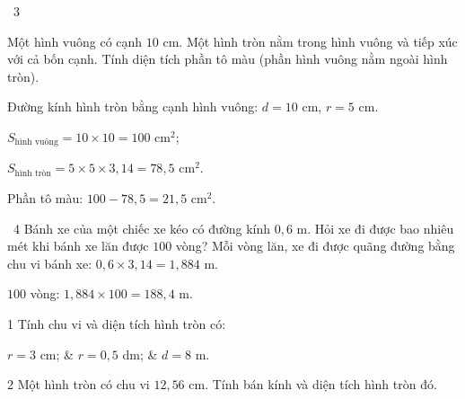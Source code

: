 \begin{exbox}{\ExWord\ 3}
\begin{minipage}[t]{0.66\linewidth}
Một hình vuông có cạnh $10$ cm. Một hình tròn nằm trong hình vuông và tiếp xúc với cả bốn cạnh. Tính diện tích phần tô màu (phần hình vuông nằm ngoài hình tròn).
\end{minipage}\hfill
\begin{minipage}[t]{0.3\linewidth}\vspace{0pt}\centering
{}
\end{minipage}
\guide
Đường kính hình tròn bằng cạnh hình vuông: $d=10$ cm, $r=5$ cm.\par
$S_\text{hình vuông}=10\times10=100$ cm$^2$;\par $S_\text{hình tròn}=5\times5\times3{,}14=78{,}5$ cm$^2$.\par
Phần tô màu: $100-78{,}5=21{,}5$ cm$^2$.
\end{exbox}
\gap
\begin{exbox}{\ExWord\ 4}
Bánh xe của một chiếc xe kéo có đường kính $0{,}6$ m. Hỏi xe đi được bao nhiêu mét khi bánh xe lăn được $100$ vòng?
\guide
Mỗi vòng lăn, xe đi được quãng đường bằng chu vi bánh xe: $0{,}6\times3{,}14=1{,}884$ m.\par
$100$ vòng: $1{,}884\times100=188{,}4$ m.
\end{exbox}
\begin{probbox}{1}{\relax}
Tính chu vi và diện tích hình tròn có:
\begin{cols3}
 $r=3$ cm; &  $r=0{,}5$ dm; &  $d=8$ m.
\end{cols3}
\end{probbox}
\gap
\begin{probbox}{2}{\relax}
Một hình tròn có chu vi $12{,}56$ cm. Tính bán kính và diện tích hình tròn đó.
\end{probbox}

